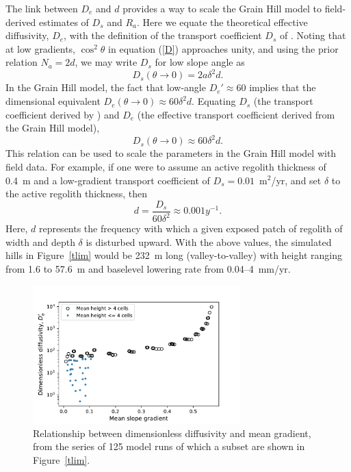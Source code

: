 \documentclass[esurf, manuscript]{copernicus}
\begin{document}
The link between $D_e$ and $d$ provides a way to scale the Grain Hill model to field-derived estimates of $D_s$ and $R_a$. Here we equate the theoretical effective diffusivity, $D_e$, with the definition of the transport coefficient $D_s$ of \citet{furbish2009statistical}. Noting that at low gradients, $\cos^2\theta$ in equation (\ref{D}) approaches unity, and using the prior relation $N_a=2d$, we may write $D_s$ for low slope angle as
\begin{equation}
D_s (\theta \rightarrow 0) = 2 a \delta^2 d.
\end{equation}
In the Grain Hill model, the fact that low-angle $D_e'\approx 60$ implies that the dimensional equivalent $D_e (\theta\rightarrow 0) \approx 60 \delta^2 d$. Equating $D_s$ (the transport coefficient derived by \citet{furbish2009statistical}) and $D_e$ (the effective transport coefficient derived from the Grain Hill model), 
\begin{equation}
D_s (\theta \rightarrow 0) \approx 60 \delta^2 d.
\label{Ds}
\end{equation}This relation can be used to scale the parameters in the Grain Hill model with field data. For example, if one were to assume an active regolith thickness of 0.4~m and a low-gradient transport coefficient of $D_s = 0.01$~m$^2$/yr, and set $\delta$ to the active regolith thickness, then
\begin{equation}
d = \frac{D_s} {60 \delta^2} \approx 0.001 y^{-1}.
\end{equation}
Here, $d$ represents the frequency with which a given exposed patch of regolith of width and depth $\delta$ is disturbed upward. With the above values, the simulated hills in Figure~\ref{tlim} would be 232~m long (valley-to-valley) with height ranging from 1.6 to 57.6~m and baselevel lowering rate from 0.04--4~mm/yr.

\begin{figure}[t]
\includegraphics[width=8cm]{Figures/dimless_diff_vs_grad.pdf}
\caption{Relationship between dimensionless diffusivity and mean gradient, from the series of 125 model runs of which a subset are shown in Figure~\ref{tlim}.}
\label{diffgrad}
\end{figure}
\end{document}
